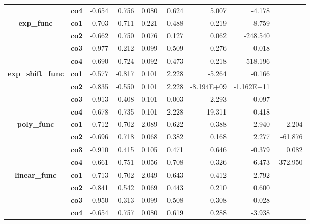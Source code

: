 \documentclass[a4paper,12pt,times,numbered,print,index]{report}
\numberwithin{equation}{section}
\begin{document}
\begin{table}[htbp]
\begin{adjustbox}{max width=0.7\textwidth}
\begin{tabular}{ccrrrrrrr}
			& \textbf{co4} & -0.654 & 0.756 & 0.080 & 0.624 & 5.007 & -4.178 &  \\
			\multirow{4}[0]{*}{\textbf{exp\_func}} & \textbf{co1} & -0.703 & 0.711 & 0.221 & 0.488 & 0.219 & -8.759 &  \\
			& \textbf{co2} & -0.662 & 0.750 & 0.076 & 0.127 & 0.062 & -248.540 &  \\
			& \textbf{co3} & -0.977 & 0.212 & 0.099 & 0.509 & 0.276 & 0.018 &  \\
			& \textbf{co4} & -0.690 & 0.724 & 0.092 & 0.473 & 0.218 & -518.196 &  \\
			\multirow{4}[0]{*}{\textbf{exp\_shift\_func}} & \textbf{co1} & -0.577 & -0.817 & 0.101 & 2.228 & -5.264 & -0.166 &  \\
			& \textbf{co2} & -0.835 & -0.550 & 0.101 & 2.228 & -8.194E+09 & -1.162E+11 &  \\
			& \textbf{co3} & -0.913 & 0.408 & 0.101 & -0.003 & 2.293 & -0.097 &  \\
			& \textbf{co4} & -0.678 & 0.735 & 0.101 & 2.228 & 19.311 & -0.418 &  \\
			\multirow{4}[0]{*}{\textbf{poly\_func}} & \textbf{co1} & -0.712 & 0.702 & 2.089 & 0.622 & 0.388 & -2.940 & 2.204 \\
			& \textbf{co2} & -0.696 & 0.718 & 0.068 & 0.382 & 0.168 & 2.277 & -61.876 \\
			& \textbf{co3} & -0.910 & 0.415 & 0.105 & 0.471 & 0.646 & -0.379 & 0.082 \\
			& \textbf{co4} & -0.661 & 0.751 & 0.056 & 0.708 & 0.326 & -6.473 & -372.950 \\
			\multirow{4}[1]{*}{\textbf{linear\_func}} & \textbf{co1} & -0.713 & 0.702 & 2.049 & 0.643 & 0.412 & -2.792 &  \\
			& \textbf{co2} & -0.841 & 0.542 & 0.069 & 0.443 & 0.210 & 0.600 &  \\
			& \textbf{co3} & -0.950 & 0.313 & 0.099 & 0.508 & 0.308 & -0.028 &  \\
			& \textbf{co4} & -0.654 & 0.757 & 0.080 & 0.619 & 0.288 & -3.938 &  \\
			\bottomrule
			\bottomrule
		\end{tabular}%
	\end{adjustbox}
	\label{full}%
\end{table}%
\end{document}
